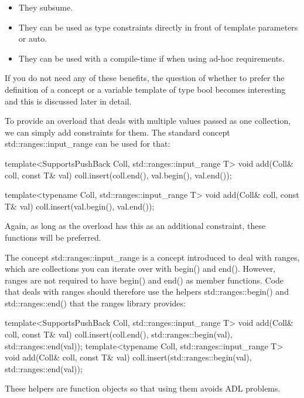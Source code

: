 \begin{itemize}
\item
They subsume.

\item
They can be used as type constraints directly in front of template parameters or auto.

\item
They can be used with a compile-time if when using ad-hoc requirements.
\end{itemize}

If you do not need any of these benefits, the question of whether to prefer the definition of a concept or a variable template of type bool becomes interesting and this is discussed later in detail.


To provide an overload that deals with multiple values passed as one collection, we can simply add constraints for them. The standard concept std::ranges::input\_range can be used for that:

\begin{cpp}
template<SupportsPushBack Coll, std::ranges::input_range T>
void add(Coll& coll, const T& val)
{
	coll.insert(coll.end(), val.begin(), val.end());
}

template<typename Coll, std::ranges::input_range T>
void add(Coll& coll, const T& val)
{
	coll.insert(val.begin(), val.end());
}
\end{cpp}

Again, as long as the overload has this as an additional constraint, these functions will be preferred.

The concept std::ranges::input\_range is a concept introduced to deal with ranges, which are collections you can iterate over with begin() and end(). However, ranges are not required to have begin() and end() as member functions. Code that deals with ranges should therefore use the helpers std::ranges::begin() and std::ranges::end() that the ranges library provides:

\begin{cpp}
template<SupportsPushBack Coll, std::ranges::input_range T>
void add(Coll& coll, const T& val)
{
	coll.insert(coll.end(), std::ranges::begin(val), std::ranges::end(val));
}
template<typename Coll, std::ranges::input_range T>
void add(Coll& coll, const T& val)
{
	coll.insert(std::ranges::begin(val), std::ranges::end(val));
}
\end{cpp}

These helpers are function objects so that using them avoids ADL problems.

